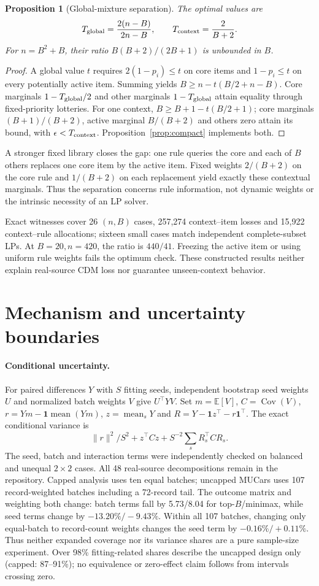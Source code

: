 \documentclass[11pt]{article}
\newtheorem{proposition}{Proposition}
\begin{document}
\begin{proposition}[Global-mixture separation]
The optimal values are
\[
 T_{\rm global}=\frac{2(n-B)}{2n-B},\qquad
 T_{\rm context}=\frac{2}{B+2}.
\]
For $n=B^2+B$, their ratio $B(B+2)/(2B+1)$ is unbounded in $B$.
\end{proposition}
\begin{proof}
A global value $t$ requires $2(1-p_i)\le t$ on core items and
$1-p_i\le t$ on every potentially active item. Summing yields
$B\ge n-t(B/2+n-B)$. Core marginals $1-T_{\rm global}/2$ and other
marginals $1-T_{\rm global}$ attain equality through fixed-priority lotteries.
For one context, $B\ge B+1-t(B/2+1)$; core marginals $(B+1)/(B+2)$,
active marginal $B/(B+2)$ and others zero attain its bound, with
$\epsilon<T_{\rm context}$. Proposition~\ref{prop:compact} implements both.
\end{proof}
A stronger fixed library closes the gap: one rule queries the core and each
of $B$ others replaces one core item by the active item. Fixed weights
$2/(B+2)$ on the core rule and $1/(B+2)$ on each replacement yield exactly
these contextual marginals. Thus the separation concerns rule information,
not dynamic weights or the intrinsic necessity of an LP solver.

Exact witnesses cover 26 $(n,B)$ cases, 257,274 context--item losses and
15,922 context--rule allocations; sixteen small cases match independent
complete-subset LPs. At $B=20,n=420$, the ratio is $440/41$. Freezing the
active item or using uniform rule weights fails the optimum check. These
constructed results neither explain real-source CDM loss nor guarantee
unseen-context behavior.

\section{Mechanism and uncertainty boundaries}\label{app:diagnostics}
\paragraph{Conditional uncertainty.}
For paired differences $Y$ with $S$ fitting seeds, independent bootstrap seed weights
$U$ and normalized batch weights $V$ give $U^\top YV$. Set
$m=\mathbb E[V]$, $C=\operatorname{Cov}(V)$,
$r=Ym-\mathbf1\operatorname{mean}(Ym)$, $z=\operatorname{mean}_sY$ and
$R=Y-\mathbf1z^\top-r\mathbf1^\top$. The exact conditional variance is
\[
 \|r\|^2/S^2+z^\top Cz+S^{-2}\sum_sR_s^\top CR_s.
\]
The seed, batch and interaction terms were independently checked on balanced
and unequal $2\times2$ cases. All 48 real-source decompositions remain in
the repository. Capped analysis uses ten equal batches; uncapped MUCars uses
107 record-weighted batches including a 72-record tail. The outcome matrix
and weighting both change: batch terms fall by 5.73/8.04 for top-$B$/minimax,
while seed terms change by $-13.20\%/-9.43\%$. Within all 107 batches, changing
only equal-batch to record-count weights changes the seed term by
$-0.16\%/+0.11\%$. Thus neither expanded coverage nor its variance shares
are a pure sample-size experiment. Over 98\% fitting-related shares describe
the uncapped design only (capped: 87--91\%); no equivalence or zero-effect
claim follows from intervals crossing zero.
\end{document}
